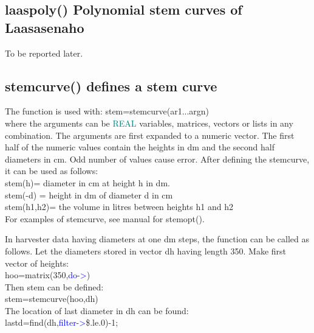\subsection{\textcolor{VioletRed}{laaspoly}() Polynomial stem curves of Laasasenaho} 
\label{laaspoly} 
To be reported later. 
\subsection{\textcolor{VioletRed}{stemcurve}() defines a stem curve} 
\label{stemcurve} 
The function is used with: 
stem=\textcolor{VioletRed}{stemcurve}(ar1...argn)\\ 
where the arguments can be \textcolor{teal}{REAL} variables, matrices, vectors or lists in any combination. 
The arguments are first expanded to a numeric vector. The first half of the numeric values 
contain the heights in dm and the second half diameters in cm. Odd number of values 
cause error. After defining the stemcurve, it can be used as follows:\\ 
stem(h)= diameter in cm at height h in dm.\\ 
stem(-d) = height in dm of diameter d in cm\\ 
stem(h1,h2)= the volume in litres between heights h1 and h2\\ 
For examples of stemcurve, see manual for \textcolor{VioletRed}{stemopt}(). 
\begin{note} 
In harvester data having diameters at one dm steps, the function can be called as follows. 
Let the diameters stored in vector dh having length 350. Make first vector of heights:\\ 
hoo=\textcolor{VioletRed}{matrix}(350,\textcolor{blue}{do->})\\ 
Then stem can be defined:\\ 
stem=\textcolor{VioletRed}{stemcurve}(hoo,dh)\\ 
The location of last diameter in dh can be found:\\ 
lastd=\textcolor{VioletRed}{find}(dh,\textcolor{blue}{filter->}\$.le.0)-1; 
\end{note} 
 
